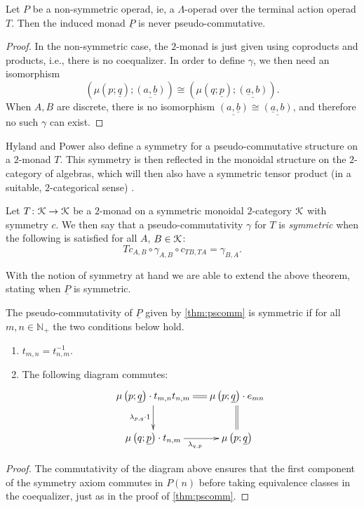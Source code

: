 \begin{cor}\label{cor:not-pc}
Let $P$ be a non-symmetric operad, ie, a $\Lambda$-operad over the terminal action operad $T$. Then the induced monad $\underline{P}$ is never pseudo-commutative.
\end{cor}
\begin{proof}
In the non-symmetric case, the $2$-monad is just given using coproducts and products, i.e., there is no coequalizer. In order to define $\gamma$, we then need an isomorphism
  \[
    \left(\mu(p; \underline{q}); \underline{(a, \underline{b})}\right) \cong \left(\mu(q; \underline{p}); \underline{(\underline{a},b)}\right).
  \]
When $A,B$ are discrete, there is no isomorphism $\underline{\left(a,\underline{b}\right)} \cong \underline{\left(\underline{a},b\right)}$, and therefore no such $\gamma$ can exist.
\end{proof}



Hyland and Power also define a symmetry for a pseudo-commutative structure on a $2$-monad $T$. This symmetry is then reflected in the monoidal structure on the $2$-category of algebras, which will then also have a symmetric tensor product (in a suitable, $2$-categorical sense) \cite[Theorem 13]{HP}.

\begin{Defi}
Let $T \colon \mathcal{K} \rightarrow \mathcal{K}$ be a $2$-monad on a symmetric monoidal $2$-category $\mathcal{K}$ with symmetry $c$. We then say that a pseudo-commutativity $\gamma$ for $T$ is \textit{symmetric} when the following is satisfied for all $A$, $B \in \mathcal{K}$:
    \[
        Tc_{A,B} \circ \gamma_{A,B} \circ c_{TB, TA} = \gamma_{B,A}.
    \]
\end{Defi}

With the notion of symmetry at hand we are able to extend the above theorem, stating when $\underline{P}$ is symmetric.
\begin{thm}
The pseudo-commutativity of $\underline{P}$ given by \cref{thm:pscomm}  is symmetric if for all $m,n \in \mathbb{N}_+$ the two conditions below hold.
    \begin{enumerate}
        \item $t_{m,n} = t_{n,m}^{-1}$.
        \item The following diagram commutes:
          \[
              \xy
                (0,0)*+{\mu\left(p;\underline{q}\right) \cdot t_{m,n}t_{n,m}}="00";
                (30,0)*+{\mu\left(p;\underline{q}\right) \cdot e_{mn}}="10";
                (0,-15)*+{\mu\left(q;\underline{p}\right) \cdot t_{n,m}}="01";
                (30,-15)*+{\mu\left(p;\underline{q}\right)}="11";
                {\ar@{=} "00" ; "10"};
                {\ar_{\lambda_{p,q} \cdot 1} "00" ; "01"};
                {\ar@{=} "10" ; "11"};
                {\ar_{\lambda_{q,p}} "01" ; "11"};
              \endxy
          \]
    \end{enumerate}
\end{thm}
\begin{proof}
The commutativity of the diagram above ensures that the first component of the symmetry axiom commutes in $P(n)$ before taking equivalence classes in the coequalizer, just as in the proof of \cref{thm:pscomm}.
\end{proof}

